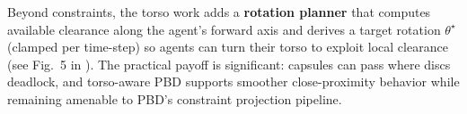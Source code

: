 Beyond constraints, the torso work adds a \textbf{rotation planner} that computes available clearance along the agent's forward axis and derives a target rotation $\theta^\star$ (clamped per time-step) so agents can turn their torso to exploit local clearance (see Fig.~5 in \cite{talukdar2025}). The practical payoff is significant: capsules can pass where discs deadlock, and torso-aware PBD supports smoother close-proximity behavior while remaining amenable to PBD's constraint projection pipeline.
